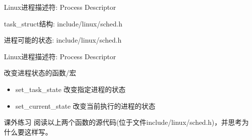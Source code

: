 \documentclass[xcolor=svgnames]{beamer}
\begin{document}
\begin{CJK*}{UTF8}{gbsn}
\begin{frame}{Linux进程描述符: Process Descriptor}
\begin{block}{task\_struct结构: include/linux/sched.h}
\lstPCBstate
\end{block}
\begin{block}{进程可能的状态: include/linux/sched.h}
\lststates
\end{block}
\end{frame}

\begin{frame}{Linux进程描述符: Process Descriptor}
\begin{block}{改变进程状态的函数/宏}
\begin{itemize}
\item set\_task\_state 改变指定进程的状态
\item set\_current\_state 改变当前执行的进程的状态
\end{itemize}
\end{block}
\begin{block}{课外练习}
阅读以上两个函数的源代码(位于文件include/linux/sched.h)，并思考为什么要这样写。
\end{block}
\end{frame}

%

%


\end{CJK*}
\end{document}
